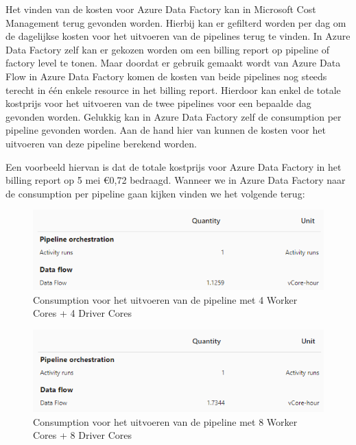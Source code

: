 Het vinden van de kosten voor Azure Data Factory kan in Microsoft Cost Management terug gevonden worden. Hierbij kan er gefilterd worden per dag om de dagelijkse kosten voor het uitvoeren van de pipelines terug te vinden. In Azure Data Factory zelf kan er gekozen worden om een billing report op pipeline of factory level te tonen. Maar doordat er gebruik gemaakt wordt van Azure Data Flow in Azure Data Factory komen de kosten van beide pipelines nog steeds terecht in één enkele resource in het billing report. Hierdoor kan enkel de totale kostprijs voor het uitvoeren van de twee pipelines voor een bepaalde dag gevonden worden. Gelukkig kan in Azure Data Factory zelf de consumption per pipeline gevonden worden. Aan de hand hier van kunnen de kosten voor het uitvoeren van deze pipeline berekend worden.

Een voorbeeld hiervan is dat de totale kostprijs voor Azure Data Factory in het billing report op 5 mei €0,72 bedraagd. Wanneer we in Azure Data Factory naar de consumption per pipeline gaan kijken vinden we het volgende terug:


\begin{figure}[H]
    \centering
    \includegraphics[width=1\textwidth]{./graphics/kosten/5_mei_consumption_small.png}
    \caption{Consumption voor het uitvoeren van de pipeline met 4 Worker Cores + 4 Driver Cores}
\end{figure}

    
\begin{figure}[H]
    \centering
    \includegraphics[width=1\textwidth]{./graphics/kosten/5_mei_consumption_medium.png}
    \caption{Consumption voor het uitvoeren van de pipeline met 8 Worker Cores + 8 Driver Cores}
\end{figure}

